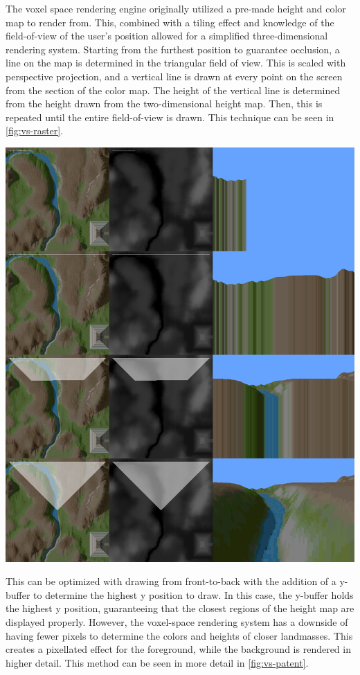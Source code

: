 \documentclass[10pt]{report}
\begin{document}
		The voxel space rendering engine originally utilized a pre-made height and color map to render from. This, combined with a tiling effect and knowledge of the field-of-view of the user's position allowed for a simplified three-dimensional rendering system. Starting from the furthest position to guarantee occlusion, a line on the map is determined in the triangular field of view. This is scaled with perspective projection, and a vertical line is drawn at every point on the screen from the section of the color map. The height of the vertical line is determined from the height drawn from the two-dimensional height map. Then, this is repeated until the entire field-of-view is drawn. This technique can be seen in \autoref{fig:vs-raster}. 
		
		\begin{minipage}{\textwidth}
			\centering
			\includegraphics[scale=.2]{line-by-line}
			\label{fig:vs-raster}
		\end{minipage}
	
		This can be optimized with drawing from front-to-back with the addition of a y-buffer to determine the highest y position to draw. In this case, the y-buffer holds the highest y position, guaranteeing that the closest regions of the height map are displayed properly. However, the voxel-space rendering system has a downside of having fewer pixels to determine the colors and heights of closer landmasses. This creates a pixellated effect for the foreground, while the background is rendered in higher detail. This method can be seen in more detail in \autoref{fig:vs-patent}. 
		 
\end{document}
